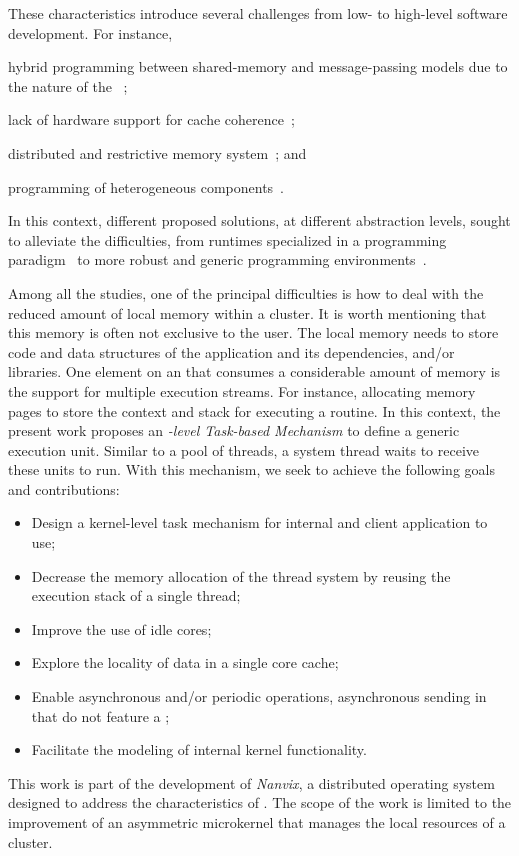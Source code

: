 	These characteristics introduce several challenges from low- to high-level
	software development. For instance,
	\begin{enumerate*}[label=(\roman*)]
		\item hybrid programming between shared-memory and message-passing
			models due to the nature of the \lws~\cite{kelly2013};
		\item lack of hardware support for cache coherence~\cite{francesquini2015};
		\item distributed and restrictive memory system~\cite{Castro2016}; and
		\item programming of heterogeneous components~\cite{Barbalace2015}.
	\end{enumerate*}
	In this context, different proposed solutions, at different abstraction
	levels, sought to alleviate the difficulties, from runtimes specialized in
	a programming paradigm~\cite{Zhou:coroutine, Cesarini:task} to more robust
	and generic programming environments~\cite{Penna:Microkernel}.

	Among all the studies, one of the principal difficulties is how to deal
	with the reduced amount of local memory within a cluster. It is worth
	mentioning that this memory is often not exclusive to the user. The local
	memory needs to store code and data structures of the application and its
	dependencies, \eg \os and/or libraries. One element on an \os that consumes
	a considerable amount of memory is the support for multiple execution
	streams. For instance, allocating memory pages to store the context and
	stack for executing a routine.
	In this context, the present work proposes an \textit{\os-level Task-based
	Mechanism} to define a generic execution unit.  Similar to a pool of
	threads, a system thread waits to receive these units to run.
	With this mechanism, we seek to achieve the following goals
	and contributions:
	\begin{itemize}
		\item Design a kernel-level task mechanism for internal \os and client
			application to use;
		\item Decrease the memory allocation of the thread system by reusing
			the execution stack of a single thread;
		\item Improve the use of idle cores;
		\item Explore the locality of data in a single core cache;
		\item Enable asynchronous and/or periodic operations, \eg
			asynchronous sending in \lws that do not feature a \dma;
		\item Facilitate the modeling of internal kernel functionality.
	\end{itemize}
	This work is part of the development of \textit{Nanvix}, a distributed
	operating system designed to address the characteristics of \lws. The scope
	of the work is limited to the improvement of an asymmetric microkernel that
	manages the local resources of a cluster.

